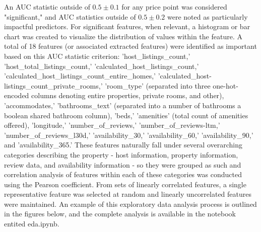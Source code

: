 \documentclass[12pt]{article}
\newtheorem{Proof of Lemma}{Proof of Lemma}
\begin{document}
An AUC statistic outside of $0.5 \pm 0.1$ for any price point was considered "significant," and AUC statistics outside of $0.5 \pm 0.2$ were noted as particularly impactful predictors. For significant features, when relevant, a histogram or bar chart was created to visualize the distribution of values within the feature. A total of 18 features (or associated extracted features) were identified as important based on this AUC statistic criterion: 'host\_listings\_count,' 'host\_total\_listings\_count,' 'calculated\_host\_listings\_count,' 'calculated\_host\_listings\_count\_entire\_homes,' 'calculated\_host-listings\_count\_private\_rooms,' 'room\_type' (separated into three one-hot-encoded columns denoting entire properties, private rooms, and other), 'accommodates,' 'bathrooms\_text' (separated into a number of bathrooms a boolean shared bathroom column), 'beds,' 'amenities' (total count of amenities offered), 'longitude,' 'number\_of\_reviews,' 'number\_of\_reviews-ltm,' 'number\_of\_reviews\_l30d,' 'availability\_30,' 'availability\_60,' 'availability\_90,' and 'availability\_365.' These features naturally fall under several overarching categories describing the property - host information, property information, review data, and availability information - so they were grouped as such and correlation analysis of features within each of these categories was conducted using the Pearson coefficient. From sets of linearly correlated features, a single representative feature was selected at random and linearly uncorrelated features were maintained. An example of this exploratory data analysis process is outlined in the figures below, and the complete analysis is available in the notebook entited eda.ipynb.
\end{document}
